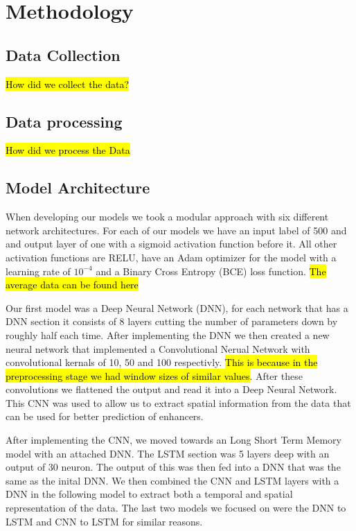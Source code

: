 \section{Methodology}

\subsection{Data Collection}
\label{Methodology:DC}

\hl{How did we collect the data?}

\subsection{Data processing}

\hl{How did we process the Data}



\subsection{Model Architecture}
\label{Methodology: Model Architecture}

When developing our models we took a modular approach with six different network architectures. For each of our models we have an input label of 500 and and output layer of one with a sigmoid activation function before it. All other activation functions are RELU, have an Adam optimizer for the model with a learning rate of $10^{-4}$ and a Binary Cross Entropy (BCE) loss function. \hl{The average data can be found here}

Our first model was a Deep Neural Network (DNN), for each network that has a DNN section it consists of 8 layers cutting the number of parameters down by roughly half each time. After implementing the DNN we then created a new neural network that implemented a Convolutional Nerual Network with convolutional kernals of 10, 50 and 100 respectivly. \hl{This is because in the preprocessing stage we had window sizes of similar values}. After these convolutions we flattened the output and read it into a Deep Neural Network. This CNN was used to allow us to extract spatial information from the data that can be used for better prediction of enhancers. 

After implementing the CNN, we moved towards an Long Short Term Memory model with an attached DNN. The LSTM section was 5 layers deep with an output of 30 neuron. The output of this was then fed into a DNN that was the same as the inital DNN. We then combined the CNN and LSTM layers with a DNN in the following model to extract both a temporal and spatial representation of the data. The last two models we focused on were the DNN to LSTM and CNN to LSTM for similar reasons. 